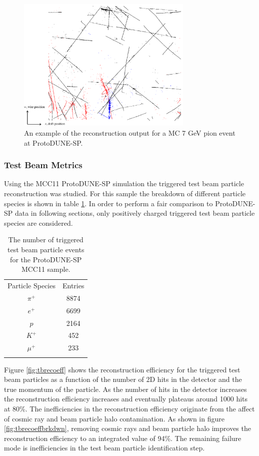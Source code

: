 \begin{figure}
\includegraphics[width=0.75\textwidth]{Figures/EventDisplays/MC/EventComposition.pdf} 
\caption{An example of the reconstruction output for a MC 7 GeV pion event at ProtoDUNE-SP.}
\label{fig:1b}
\end{figure}

\subsubsection{Test Beam Metrics}

Using the MCC11 ProtoDUNE-SP simulation the triggered test beam particle reconstruction was studied. For this sample the breakdown of different particle species is shown in table \ref{tab:mcc11species}.  In order to perform a fair comparison to ProtoDUNE-SP data in following sections, only positively charged triggered test beam particle species are considered.

\begin{table}
\centering
\caption{The number of triggered test beam particle events for the ProtoDUNE-SP MCC11 sample.}
\label{tab:mcc11species} 
\begin{tabular}{cc}
\hline\noalign{\smallskip}
Particle Species & Entries  \\
\noalign{\smallskip}\hline\noalign{\smallskip}
$\pi^{+}$ & 8874 \\
$e^{+}$ & 6699 \\
$p$ & 2164 \\
$K^{+}$ & 452 \\
$\mu^{+}$ & 233 \\
\noalign{\smallskip}\hline
\end{tabular}
\end{table}

Figure \ref{fig:tbrecoeff} shows the reconstruction efficiency for the triggered test beam particles as a function of the number of 2D hits in the detector and the true momentum of the particle.  As the number of hits in the detector increases the reconstruction efficiency increases and eventually plateaus around 1000 hits at 80\%.  The inefficiencies in the reconstruction efficiency originate from the affect of cosmic ray and beam particle halo contamination.  As shown in figure \ref{fig:tbrecoeffbrkdwn}, removing cosmic rays and beam particle halo improves the reconstruction efficiency to an integrated value of 94\%.  The remaining failure mode is inefficiencies in the test beam particle identification step.

